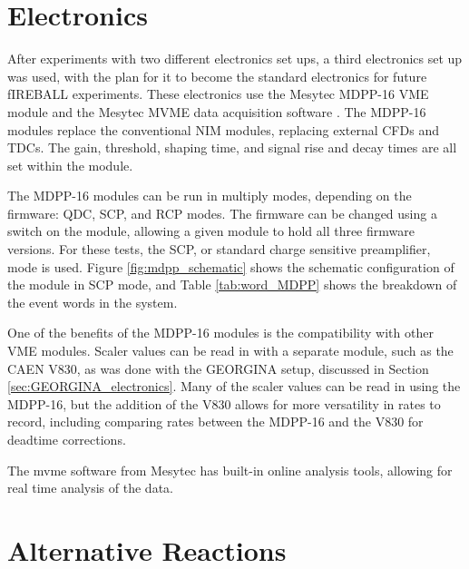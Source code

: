 \section{Electronics}

After experiments with two different electronics set ups, a third electronics set up was used, with the plan for it to become the standard electronics for future fIREBALL experiments. These electronics use the Mesytec MDPP-16 VME module and the Mesytec MVME data acquisition software \citep{mesytec:_mdpp,mesytec:_mvme}. The MDPP-16 modules replace the conventional NIM modules, replacing external CFDs and TDCs. The gain, threshold, shaping time, and signal rise and decay times are all set within the module. 

The MDPP-16 modules can be run in multiply modes, depending on the firmware: QDC, SCP, and RCP modes. The firmware can be changed using a switch on the module, allowing a given module to hold all three firmware versions. For these tests, the SCP, or standard charge sensitive preamplifier, mode is used. Figure \ref{fig:mdpp_schematic} shows the schematic configuration of the module in SCP mode, and Table \ref{tab:word_MDPP} shows the breakdown of the event words in the system.





One of the benefits of the MDPP-16 modules is the compatibility with other VME modules. Scaler values can be read in with a separate module, such as the CAEN V830, as was done with the GEORGINA setup, discussed in Section \ref{sec:GEORGINA_electronics}. Many of the scaler values can be read in using the MDPP-16, but the addition of the V830 allows for more versatility in rates to record, including comparing rates between the MDPP-16 and the V830 for deadtime corrections.

The mvme software from Mesytec has built-in online analysis tools, allowing for real time analysis of the data.

\section{Alternative Reactions}
